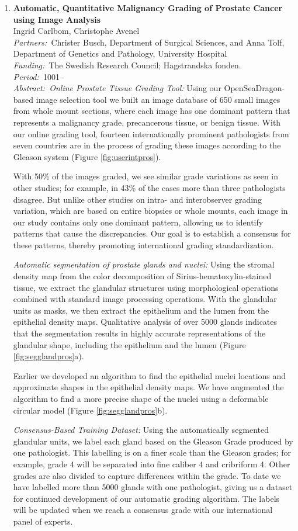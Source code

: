 \documentclass[10pt, a4paper]{article}
\newcommand{\aabstract}[1]{\emph{Abstract:~}#1}
\newcommand{\ffunding}[1]{\emph{Funding:~}#1\\}
\newcommand{\ppartners}[1]{\emph{Partners:~}#1\\}
\newcommand{\pperiod}[1]{\emph{Period:~}#1\\}
\begin{document}
{\begin{enumerate}

\item 
\textbf{Automatic, Quantitative Malignancy Grading of Prostate Cancer using Image Analysis}\\
Ingrid Carlbom, Christophe Avenel\\
\ppartners{Christer Busch, Department of Surgical Sciences, and Anna Tolf, Department of Genetics and Pathology, University Hospital}
\ffunding{The Swedish Research Council; Hagstrandska fonden.}
\pperiod{1001--}
\aabstract{\textit{Online Prostate Tissue Grading Tool: }Using our OpenSeaDragon-based image selection tool we built an image database of 650 small images from whole mount sections, where each image has one dominant pattern that represents a malignancy grade, precancerous tissue, or benign tissue. With our online grading tool, fourteen internationally prominent pathologists from seven countries are in the process of grading these images according to the Gleason system (Figure \ref{fig:userintpros}). 
	
With 50\% of the images graded, we see similar grade variations as seen in other studies; for example, in 43\% of the cases more than three pathologists disagree. But unlike other studies on intra- and interobserver grading variation, which are based on entire biopsies or whole mounts, each image in our study contains only one dominant pattern, allowing us to identify patterns that cause the discrepancies. Our goal is to establish a consensus for these patterns, thereby promoting international grading standardization.

\textit{Automatic segmentation of prostate glands and nuclei: }Using the stromal density map from the color decomposition of Sirius-hematoxylin-stained tissue, we extract the glandular structures using morphological operations combined with standard image processing operations. With the glandular units as masks, we then extract the epithelium and the lumen from the epithelial density maps. Qualitative analysis of over 5000 glands indicates that the segmentation results in highly accurate representations of the glandular shape, including the epithelium and the lumen (Figure \ref{fig:segglandpros}a).

Earlier we developed an algorithm to find the epithelial nuclei locations and approximate shapes in the epithelial density maps. We have augmented the algorithm to find a more precise shape of the nuclei using a deformable circular model (Figure \ref{fig:segglandpros}b).

\textit{Consensus-Based Training Dataset: }	Using the automatically segmented glandular units, we label each gland based on the Gleason Grade produced by one pathologist. This labelling is on a finer scale than the Gleason grades; for example, grade 4 will be separated into fine caliber 4 and cribriform 4. Other grades are also divided to capture differences within the grade. To date we have labelled more than 5000 glands with one pathologist, giving us a dataset for continued development of our automatic grading algorithm. The labels will be updated when we reach a consensus grade with our international panel of experts.}


\end{enumerate}}
\end{document}
